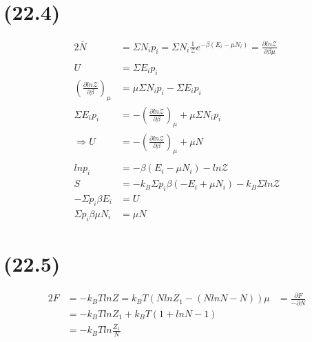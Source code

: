 \begin{latin}
    \section*{(22.4)}
    \begin{alignat*}{2}
        \overline{N} &= \Sigma N_i p_i = \Sigma N_i \frac{1}{\mathcal{Z}} e^{-\beta(E_i - \mu N_i)} = \frac{\partial ln \mathcal{Z} }{ \partial \beta \mu} \\
        \\
        U &= \Sigma E_i p_i \\
        (\frac{\partial ln \mathcal{Z} }{ \partial \beta })_\mu &= \mu  \Sigma N_i p_i - \Sigma E_i p_i \\
        \Sigma E_i p_i &=  -(\frac{\partial ln \mathcal{Z} }{ \partial \beta })_\mu +\mu  \Sigma N_i p_i\\
        \Longrightarrow U &=  -(\frac{\partial ln \mathcal{Z} }{ \partial \beta })_\mu + \mu N\\
        \\
        ln p_i  &= -\beta(E_i - \mu N_i) - ln \mathcal{Z}\\
        S &= -k_B \Sigma p_i\beta(-E_i + \mu N_i) - k_B \Sigma ln \mathcal{Z} \\
        -\Sigma p_i\beta E_i &= U \\
        \Sigma p_i\beta \mu N_i &= \mu N
    \end{alignat*}
    \section*{(22.5)}
    \begin{alignat*}{2}
        F &= - k_B T lnZ = k_B T (N ln Z_1 - (Nln N - N))
        \mu &= \frac{\partial F}{- \partial N}\\
        &= -k_B T ln Z_1 + k_B T(1 + ln N -1)\\
        &= -k_B T ln \frac{Z_1}{N}
    \end{alignat*}
\end{latin}

